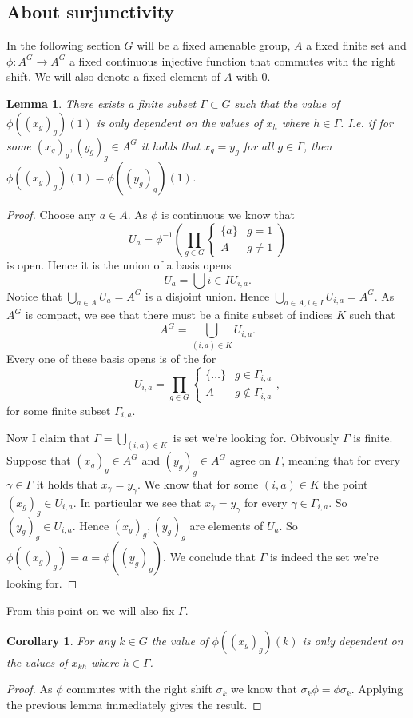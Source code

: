 \documentclass[titlepage, a4paper]{article}
\newtheorem{lemma}[theorem]{Lemma}
\newtheorem{corollary}[theorem]{Corollary}
\theoremstyle{remark}
\begin{document}
\subsection{About surjunctivity}
In the following section $G$ will be a fixed amenable group, $A$ a fixed finite set and $\phi: A^{G} \to A^{G}$ a fixed continuous injective function that commutes with the right shift. 
We will also denote a fixed element of $A$ with $0$.

\begin{lemma}
	There exists a finite subset $\Gamma \subset G$ such that the value of $\phi((x_g)_g)(1)$ is only dependent on the values of $x_h$ where  $h \in \Gamma$. 
	I.e. if for some  $(x_g)_g, (y_g)_g \in A^{G}$ it holds that $x_g = y_g$ for all $g \in \Gamma$, then $\phi((x_g)_g)(1) = \phi((y_g)_g)(1)$.
\end{lemma}
\begin{proof}
	Choose any $a \in A$. As $\phi$ is continuous we know that \[
	U_a = \phi^{-1}\left( \prod_{g\in G} \begin{cases}
			\{a\} & g = 1\\
			A & g \ne 1
	\end{cases} \right)
\]
	is open. Hence it is the union of a basis opens  \[
		U_a= \bigcup{i \in I} U_{i,a}
	.\] 
	Notice that $\bigcup_{a \in A} U_a = A^{G}$ is a disjoint union. 
	Hence $\bigcup_{a \in A, i \in I} U_{i, a} = A^{G}$. 
	As $A^{G}$ is compact, we see that there must be a finite subset of indices $K$ such that \[
		A^{G} = \bigcup_{(i, a) \in K} U_{i, a}
	.\] 
	Every one of these basis opens is of the for \[
	U_{i,a} = \prod_{g \in G} \begin{cases}
		\{\ldots\} & g \in \Gamma_{i,a}\\
		A & g \not\in \Gamma_{i,a}
	\end{cases}
	,\]
	for some finite subset $\Gamma_{i,a}$. 

	Now I claim that $\Gamma = \bigcup_{(i,a) \in K}$ is set we're looking for. 
	Obivously $\Gamma$ is finite. 
	Suppose that $(x_g)_g \in A^{G}$ and $(y_g)_g \in A^{G}$ agree on $\Gamma$,
	meaning that for every $\gamma \in \Gamma$ it holds that  $x_\gamma = y_\gamma$.
	We know that for some  $(i, a) \in K$ the point $(x_g)_g \in U_{i,a}$. 
	In particular we see that $x_\gamma = y_\gamma$ for every $\gamma \in \Gamma_{i,a}$. 
	So $(y_g)_g \in U_{i, a}$. 
	Hence  $(x_g)_g , (y_g)_g$ are elements of $U_a$. 
	So  $\phi((x_g)_g) = a = \phi((y_g)_g) $.
	We conclude that $\Gamma$ is indeed the set we're looking for.
\end{proof}
From this point on we will also fix $\Gamma$. 
\begin{corollary}
	For any $k \in G$ the value of $\phi((x_g)_g)(k)$ is only dependent on the values of $x_{kh}$ where $h \in \Gamma$.
\end{corollary}	
\begin{proof}
	As $\phi$ commutes with the right shift  $\sigma_k$ we know that $\sigma_k\phi = \phi\sigma_k$. Applying the previous lemma immediately gives the result.
\end{proof}
\end{document}
